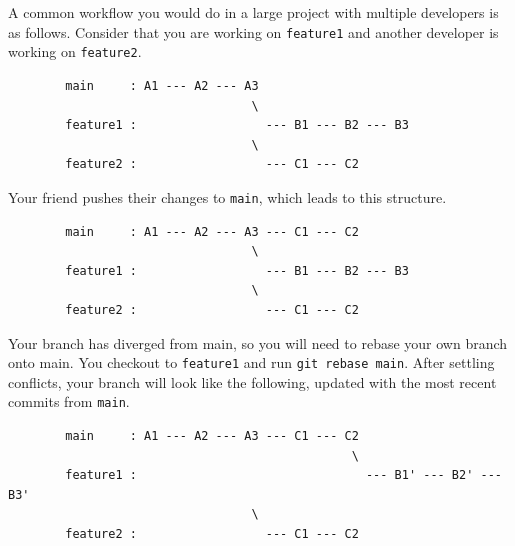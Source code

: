     \begin{example}
      A common workflow you would do in a large project with multiple developers is as follows. Consider that you are working on \texttt{feature1} and another developer is working on \texttt{feature2}. 
      \begin{lstlisting}
        main     : A1 --- A2 --- A3
                                  \
        feature1 :                  --- B1 --- B2 --- B3
                                  \
        feature2 :                  --- C1 --- C2 
      \end{lstlisting}
      Your friend pushes their changes to \texttt{main}, which leads to this structure. 
      \begin{lstlisting}
        main     : A1 --- A2 --- A3 --- C1 --- C2
                                  \
        feature1 :                  --- B1 --- B2 --- B3
                                  \
        feature2 :                  --- C1 --- C2 
      \end{lstlisting}
      Your branch has diverged from main, so you will need to rebase your own branch onto main. You checkout to \texttt{feature1} and run \texttt{git rebase main}. After settling conflicts, your branch will look like the following, updated with the most recent commits from \texttt{main}. 
      \begin{lstlisting}
        main     : A1 --- A2 --- A3 --- C1 --- C2
                                                \
        feature1 :                                --- B1' --- B2' --- B3'
                                  \
        feature2 :                  --- C1 --- C2 
      \end{lstlisting}
    \end{example}

